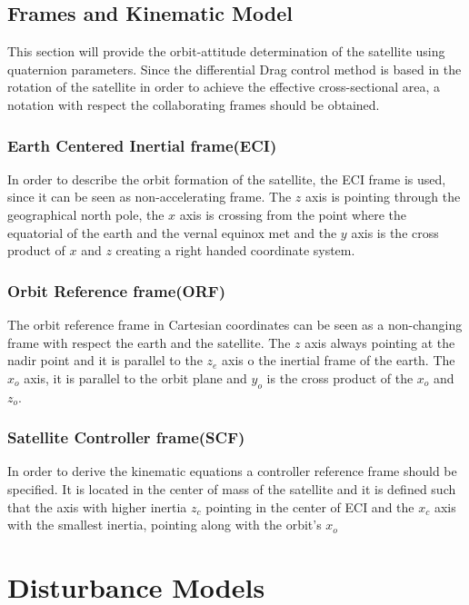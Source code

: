 \subsection{Frames and Kinematic Model}
%
This section will provide the orbit-attitude determination of the satellite using quaternion parameters. Since the differential Drag control method is based in the rotation of the satellite in order to achieve the effective cross-sectional area, a notation with respect the collaborating frames should be obtained.     
%
\subsubsection{Earth Centered Inertial frame(ECI)}
%
In order to describe the orbit formation of the satellite, the ECI frame is used, since it can be seen as non-accelerating frame. The $z$ axis is pointing through the geographical north pole, the $x$ axis is crossing from the point where the equatorial of the earth and the vernal equinox met and the $y$ axis is the cross product of $x$ and $z$ creating a right handed coordinate system. 
%
\subsubsection{Orbit Reference frame(ORF)}
%
The orbit reference frame in Cartesian coordinates can be seen as a non-changing frame with respect the earth and the satellite. The $z$ axis always pointing at the nadir point and it is parallel to the $z_{e}$ axis o the inertial frame of the earth. The $x_{o}$ axis, it is parallel to the orbit plane and $y_{o}$ is the cross product of the $x_{o}$ and $z_{o}$. 
%
\subsubsection{Satellite Controller frame(SCF)}
%
In order to derive the kinematic equations a controller reference frame should be specified. It is located in the center of mass of the satellite and it is defined such that the axis with higher inertia $z_{c}$ pointing in the center of ECI and the $x_{c}$ axis with the smallest inertia, pointing along with  the orbit's $x_{o}$ 
%
\section{Disturbance Models}\label{sec:useCase} 
